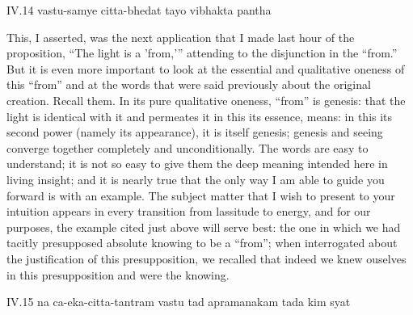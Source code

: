 IV.14
vastu-samye citta-bhedat tayo vibhakta pantha

This, I asserted, was the next application
that I made last hour of the proposition,
“The light is a 'from,'” attending to
the disjunction in the “from.”
But it is even more important to look at
the essential and qualitative oneness of this “from”
and at the words that were said previously
about the original creation.
Recall them.
In its pure qualitative oneness,
“from” is genesis:
that the light is identical with it
and permeates it in this its essence, means:
in this its second power (namely its appearance),
it is itself genesis;
genesis and seeing converge together
completely and unconditionally.
The words are easy to understand;
it is not so easy to give them the deep meaning
intended here in living insight;
and it is nearly true that the only way
I am able to guide you forward is with an example.
The subject matter that I wish to
present to your intuition appears
in every transition from lassitude to energy,
and for our purposes,
the example cited just above will serve best:
the one in which we had tacitly presupposed
absolute knowing to be a “from”;
when interrogated about the justification
of this presupposition,
we recalled that indeed we knew ouselves
in this presupposition and were the knowing.

IV.15
na ca-eka-citta-tantram vastu tad apramanakam tada kim syat

